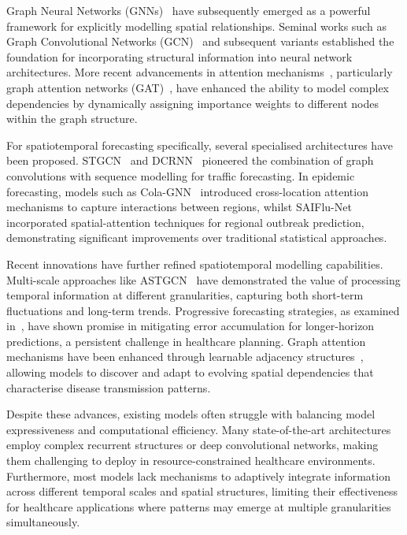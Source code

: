 \documentclass[lettersize, journal]{IEEEtran}
\begin{document}
Graph Neural Networks (GNNs)~\cite{gnn_survey} have subsequently emerged as a powerful framework for explicitly modelling spatial relationships. Seminal works such as Graph Convolutional Networks (GCN)~\cite{gcn} and subsequent variants established the foundation for incorporating structural information into neural network architectures. More recent advancements in attention mechanisms~\cite{attention_mechanisms}, particularly graph attention networks (GAT)~\cite{gat}, have enhanced the ability to model complex dependencies by dynamically assigning importance weights to different nodes within the graph structure.

For spatiotemporal forecasting specifically, several specialised architectures have been proposed. STGCN~\cite{stgcn} and DCRNN~\cite{dcrnn} pioneered the combination of graph convolutions with sequence modelling for traffic forecasting. In epidemic forecasting, models such as Cola-GNN~\cite{cola_gnn} introduced cross-location attention mechanisms to capture interactions between regions, whilst SAIFlu-Net~\cite{saiflu_net} incorporated spatial-attention techniques for regional outbreak prediction, demonstrating significant improvements over traditional statistical approaches.

Recent innovations have further refined spatiotemporal modelling capabilities. Multi-scale approaches like ASTGCN~\cite{astgcn} have demonstrated the value of processing temporal information at different granularities, capturing both short-term fluctuations and long-term trends. Progressive forecasting strategies, as examined in~\cite{progressive_forecasting}, have shown promise in mitigating error accumulation for longer-horizon predictions, a persistent challenge in healthcare planning. Graph attention mechanisms have been enhanced through learnable adjacency structures~\cite{adaptive_graph}, allowing models to discover and adapt to evolving spatial dependencies that characterise disease transmission patterns.

Despite these advances, existing models often struggle with balancing model expressiveness and computational efficiency. Many state-of-the-art architectures employ complex recurrent structures or deep convolutional networks, making them challenging to deploy in resource-constrained healthcare environments. Furthermore, most models lack mechanisms to adaptively integrate information across different temporal scales and spatial structures, limiting their effectiveness for healthcare applications where patterns may emerge at multiple granularities simultaneously.
\end{document}
